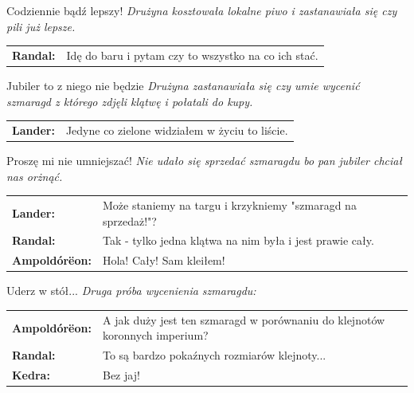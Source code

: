 \documentclass[10pt,twoside,twocolumn]{book}
\begin{document}
\begin{rpg-quotebox}{Codziennie bądź lepszy!}
   \textit{Drużyna kosztowała lokalne piwo i zastanawiała się czy pili już lepsze.}\\

   \begin{tabularx}{\columnwidth}{lX}
      \textbf{Randal:} & Idę do baru i pytam czy to wszystko na co ich stać.\\
   \end{tabularx}
\end{rpg-quotebox}


\begin{rpg-quotebox}{Jubiler to z niego nie będzie}
   \textit{Drużyna zastanawiała się czy umie wycenić szmaragd z którego zdjęli klątwę i połatali do kupy.}\\

   \begin{tabularx}{\columnwidth}{lX}
      \textbf{Lander:} & Jedyne co zielone widziałem w życiu to liście.\\
   \end{tabularx}
\end{rpg-quotebox}


\begin{rpg-quotebox}{Proszę mi nie umniejszać!}
   \textit{Nie udało się sprzedać szmaragdu bo pan jubiler chciał nas orżnąć.}\\

   \begin{tabularx}{\columnwidth}{lX}
      \textbf{Lander:} & Może staniemy na targu i krzykniemy "szmaragd na sprzedaż!"?\\
      \textbf{Randal:} & Tak - tylko jedna klątwa na nim była i jest prawie cały.\\
      \textbf{Ampoldórëon:} & Hola! Cały! Sam kleiłem!\\
   \end{tabularx}
\end{rpg-quotebox}


\begin{rpg-quotebox}{Uderz w stół...}
   \textit{Druga próba wycenienia szmaragdu:}\\

   \begin{tabularx}{\columnwidth}{lX}
      \textbf{Ampoldórëon:} & A jak duży jest ten szmaragd w porównaniu do klejnotów koronnych imperium?\\
      \textbf{Randal:} & To są bardzo pokaźnych rozmiarów klejnoty...\\
      \textbf{Kedra:} & Bez jaj!\\
   \end{tabularx}
\end{rpg-quotebox}
\end{document}
